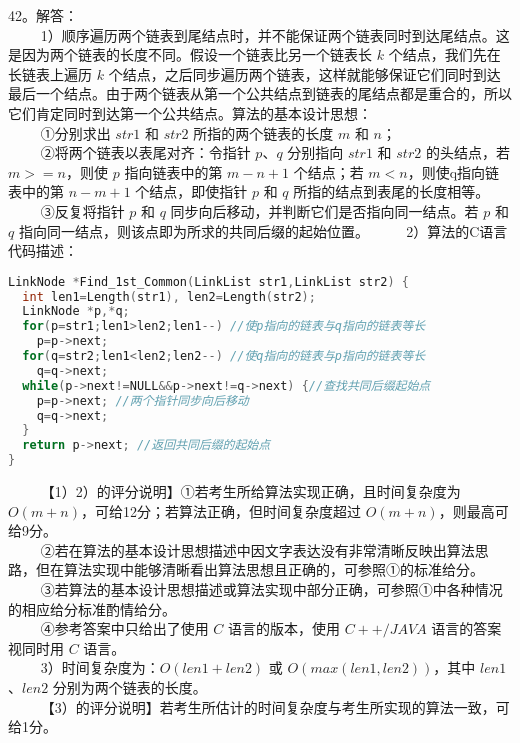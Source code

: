 42。解答：\\
$\qquad$ 1）顺序遍历两个链表到尾结点时，并不能保证两个链表同时到达尾结点。这是因为两个链表的长度不同。假设一个链表比另一个链表长 $k$ 个结点，我们先在长链表上遍历 $k$ 个结点，之后同步遍历两个链表，这样就能够保证它们同时到达最后一个结点。由于两个链表从第一个公共结点到链表的尾结点都是重合的，所以它们肯定同时到达第一个公共结点。算法的基本设计思想：\\
$\qquad$ ①分别求出 $str1$ 和 $str2$ 所指的两个链表的长度 $m$ 和 $n$；\\
$\qquad$ ②将两个链表以表尾对齐：令指针 $p$、$q$ 分别指向 $str1$ 和 $str2$ 的头结点，若 $m>=n$，则使 $p$ 指向链表中的第 $m-n+1$ 个结点；若 $m<n$，则使q指向链表中的第 $n-m+1$ 个结点，即使指针 $p$ 和 $q$ 所指的结点到表尾的长度相等。\\
$\qquad$ ③反复将指针 $p$ 和 $q$ 同步向后移动，并判断它们是否指向同一结点。若 $p$ 和 $q$ 指向同一结点，则该点即为所求的共同后缀的起始位置。
$\qquad$ 2）算法的C语言代码描述：\\
\begin{lstlisting}[language=cpp]
LinkNode *Find_1st_Common(LinkList str1,LinkList str2) {
  int len1=Length(str1), len2=Length(str2);
  LinkNode *p,*q;
  for(p=str1;len1>len2;len1--) //使p指向的链表与q指向的链表等长
    p=p->next;
  for(q=str2;len1<len2;len2--) //使q指向的链表与p指向的链表等长
    q=q->next;
  while(p->next!=NULL&&p->next!=q->next) {//查找共同后缀起始点
    p=p->next; //两个指针同步向后移动
    q=q->next;
  }
  return p->next; //返回共同后缀的起始点
}
\end{lstlisting}
$\qquad$ 【1）2）的评分说明】①若考生所给算法实现正确，且时间复杂度为 $O(m+n)$，可给12分；若算法正确，但时间复杂度超过 $O(m+n)$，则最高可给9分。\\
$\qquad$ ②若在算法的基本设计思想描述中因文字表达没有非常清晰反映出算法思路，但在算法实现中能够清晰看出算法思想且正确的，可参照①的标准给分。\\
$\qquad$ ③若算法的基本设计思想描述或算法实现中部分正确，可参照①中各种情况的相应给分标准酌情给分。\\
$\qquad$ ④参考答案中只给出了使用 $C$ 语言的版本，使用 $C++/JAVA$ 语言的答案视同时用 $C$ 语言。\\
$\qquad$ 3）时间复杂度为：$O(len1+len2)$ 或 $O(max(len1,len2))$，其中 $len1$、$len2$ 分别为两个链表的长度。\\
$\qquad$ 【3）的评分说明】若考生所估计的时间复杂度与考生所实现的算法一致，可给1分。

